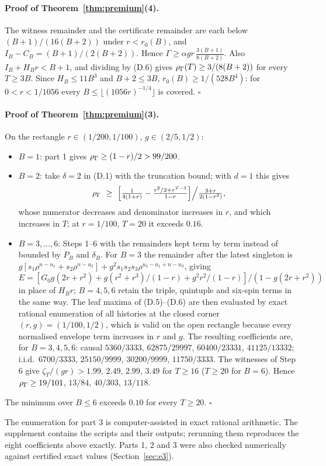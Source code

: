 \paragraph{Proof of Theorem~\ref{thm:premium}(4).} The witness remainder and the certificate remainder are each below $(B+1)/(16(B+2))$ under $r<r_0(B)$, and $I_B-C_B=(B+1)/(2(B+2))$. Hence $\Gamma\ge\alpha gr\,\frac{3(B+1)}{8(B+2)}$. Also $I_B+H_Br<B+1$, and dividing by (D.6) gives $\rho_\Gamma(T)\ge3/(8(B+2))$ for every $T\ge3B$. Since $H_B\le11B^3$ and $B+2\le3B$, $r_0(B)\ge1/(528B^4)$: for $0<r<1/1056$ every $B\le\lfloor(1056r)^{-1/4}\rfloor$ is covered. \hfill$\square$

\paragraph{Proof of Theorem~\ref{thm:premium}(3).} On the rectangle $r\in(1/200,1/100)$, $g\in(2/5,1/2)$:
\begin{itemize}
\item $B=1$: part 1 gives $\rho_\Gamma\ge(1-r)/2>99/200$.
\item $B=2$: take $\delta=2$ in (D.1) with the truncation bound; with $d=1$ this gives
\[
\rhoG\ \ge\ \Big[\tfrac1{4(1+r)}-\tfrac{r^2/2+r^{T-3}}{1-r}\Big]\Big/\tfrac{3+r}{2(1-r^2)},
\]
whose numerator decreases and denominator increases in $r$, and which increases in $T$; at $r=1/100$, $T=20$ it exceeds $0.16$.
\item $B=3,\dots,6$: Steps 1--6 with the remainders kept term by term instead of bounded by $P_B$ and $\delta_B$. For $B=3$ the remainder after the latest singleton is $g[s_1\rho^{n-u_1}+s_2\rho^{n-u_2}]+g^2s_1s_2s_3\rho^{u_2-u_1+n-u_3}$, giving $E=[G_0g(2r+r^2)+g(r^2+r^3)/(1-r)+g^2r^2/(1-r)]/(1-g(2r+r^2))$ in place of $H_Br$; $B=4,5,6$ retain the triple, quintuple and six-spin terms in the same way. The leaf maxima of (D.5)--(D.6) are then evaluated by exact rational enumeration of all histories at the closed corner $(r,g)=(1/100,1/2)$, which is valid on the open rectangle because every normalised envelope term increases in $r$ and $g$. The resulting coefficients are, for $B=3,4,5,6$: causal $5360/3333$, $62875/29997$, $60400/23331$, $41125/13332$; i.i.d.\ $6700/3333$, $25150/9999$, $30200/9999$, $11750/3333$. The witnesses of Step 6 give $\zeta_T/(gr)>1.99,\,2.49,\,2.99,\,3.49$ for $T\ge16$ ($T\ge20$ for $B=6$). Hence $\rho_\Gamma\ge19/101$, $13/84$, $40/303$, $13/118$.
\end{itemize}
The minimum over $B\le6$ exceeds $0.10$ for every $T\ge20$. \hfill$\square$

The enumeration for part 3 is computer-assisted in exact rational arithmetic. The supplement contains the scripts and their outputs; rerunning them reproduces the eight coefficients above exactly. Parts 1, 2 and 3 were also checked numerically against certified exact values (Section~\ref{sec:e3}).
